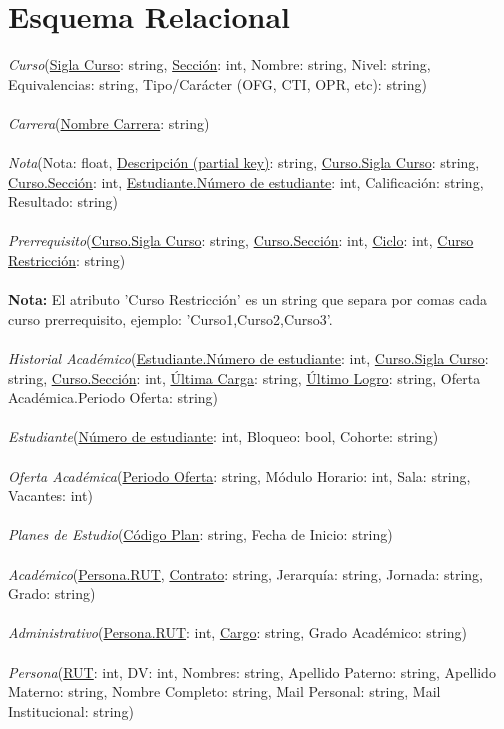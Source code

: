 \documentclass[12pt]{article}
\begin{document}
\section*{Esquema Relacional}
\textit{Curso}(\underline{Sigla Curso}: string, \underline{Sección}: int, Nombre: string, Nivel: string, Equivalencias: string, Tipo/Carácter (OFG, CTI, OPR, etc): string)\\\\
\textit{Carrera}(\underline{Nombre Carrera}: string)\\\\
\textit{Nota}(Nota: float, \underline{Descripción (partial key)}: string, \underline{Curso.Sigla Curso}: string, \underline{Curso.Sección}: int, \underline{Estudiante.Número de estudiante}: int,
Calificación: string, Resultado: string)\\\\
\textit{Prerrequisito}(\underline{Curso.Sigla Curso}: string, \underline{Curso.Sección}: int, \underline{Ciclo}: int, \underline{Curso Restricción}: string)\\\\
\textbf{Nota:} El atributo 'Curso Restricción' es un string que separa por comas cada curso prerrequisito, ejemplo: 'Curso1,Curso2,Curso3'.\\\\
\textit{Historial Académico}(\underline{Estudiante.Número de estudiante}: int, \underline{Curso.Sigla Curso}: string, \underline{Curso.Sección}: int, \underline{Última Carga}: string, \underline{Último Logro}: string, Oferta Académica.Periodo Oferta: string)\\\\
\textit{Estudiante}(\underline{Número de estudiante}: int, Bloqueo: bool, Cohorte: string)\\\\
\textit{Oferta Académica}(\underline{Periodo Oferta}: string, Módulo Horario: int, Sala: string, Vacantes: int)\\\\
\textit{Planes de Estudio}(\underline{Código Plan}: string, Fecha de Inicio: string)\\\\
\textit{Académico}(\underline{Persona.RUT}, \underline{Contrato}: string, Jerarquía: string, Jornada: string, Grado: string)\\\\
\textit{Administrativo}(\underline{Persona.RUT}: int, \underline{Cargo}: string, Grado Académico: string)\\\\
\textit{Persona}(\underline{RUT}: int, DV: int, Nombres: string, Apellido Paterno: string, Apellido Materno: string, Nombre Completo: string, Mail Personal: string, Mail Institucional: string)
\end{document}
